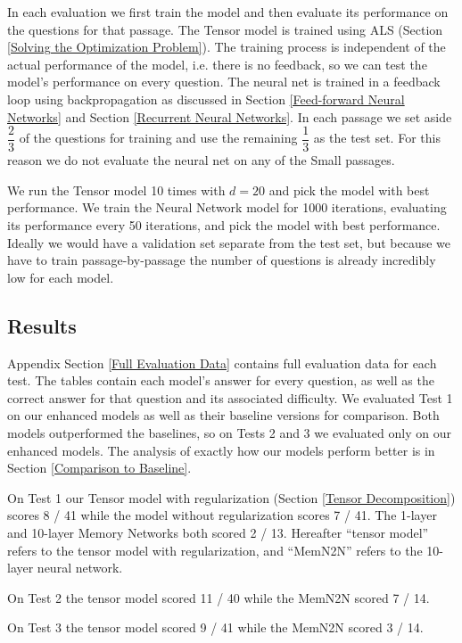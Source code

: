 \documentclass[pageno]{final_paper}
\begin{document}
In each evaluation we first train the model and then evaluate its performance on
the questions for that passage. The Tensor model is trained using ALS (Section
\ref{Solving the Optimization Problem}). The training process is independent of
the actual performance of the model, i.e. there is no feedback, so we can test
the model's performance on every question. The neural net is trained in a
feedback loop using backpropagation as discussed in Section \ref{Feed-forward
Neural Networks} and Section \ref{Recurrent Neural Networks}. In each passage we
set aside $\dfrac{2}{3}$ of the questions for training and use the remaining
$\dfrac{1}{3}$ as the test set. For this reason we do not evaluate the neural
net on any of the Small passages.

We run the Tensor model 10 times with $d=20$ and pick the model with best
performance. We train the Neural Network model for 1000 iterations, evaluating
its performance every 50 iterations, and pick the model with best performance.
Ideally we would have a validation set separate from the test set, but because
we have to train passage-by-passage the number of questions is already
incredibly low for each model.

\subsection{Results}
\label{Results}

Appendix Section \ref{Full Evaluation Data} contains full evaluation data for
each test. The tables contain each model's answer for every question, as well as
the correct answer for that question and its associated difficulty. We evaluated
Test 1 on our enhanced models as well as their baseline versions for comparison.
Both models outperformed the baselines, so on Tests 2 and 3 we evaluated only on
our enhanced models. The analysis of exactly how our models perform better is in
Section \ref{Comparison to Baseline}.

On Test 1 our Tensor model with regularization (Section \ref{Tensor
Decomposition}) scores 8 / 41 while the model without regularization scores 7 /
41. The 1-layer and 10-layer Memory Networks both scored 2 / 13. Hereafter
``tensor model'' refers to the tensor model with regularization, and ``MemN2N''
refers to the 10-layer neural network.

On Test 2 the tensor model scored 11 / 40 while the MemN2N scored 7 / 14.

On Test 3 the tensor model scored 9 / 41 while the MemN2N scored 3 / 14.
\end{document}
